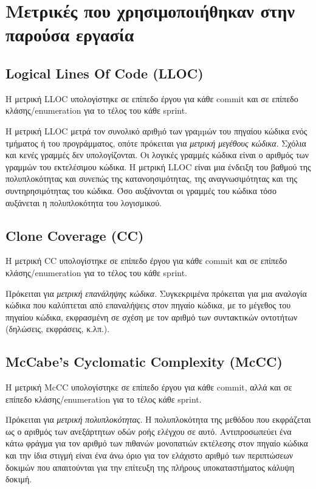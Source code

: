 \section{Μετρικές που χρησιμοποιήθηκαν στην παρούσα εργασία}

\subsection{Logical Lines Of Code (LLOC)}

Η μετρική LLOC υπολογίστηκε σε επίπεδο έργου για κάθε commit και σε
επίπεδο κλάσης/enumeration για το τέλος του κάθε sprint.

Η μετρική LLOC μετρά τον συνολικό αριθµό των γραµµών του πηγαίου κώδικα
ενός τμήματος ή του προγράμματος, οπότε πρόκειται για \emph{μετρική
μεγέθους κώδικα}. Σχόλια και κενές γραμμές δεν υπολογίζονται. Οι
λογικές γραμμές κώδικα είναι ο αριθμός των γραμμών του εκτελέσιμου
κώδικα. Η μετρική LLOC είναι μια ένδειξη του βαθμού της
πολυπλοκότητας και συνεπώς της κατανοησιμότητας, της αναγνωσιμότητας
και της συντηρησιμότητας του κώδικα. Όσο αυξάνονται οι γραμμές του
κώδικα τόσο αυξάνεται η πολυπλοκότητα του λογισμικού.


\subsection{Clone Coverage (CC)}

Η μετρική CC υπολογίστηκε σε επίπεδο έργου για κάθε commit και σε
επίπεδο κλάσης/enumeration για το τέλος του κάθε sprint.

Πρόκειται για \emph{μετρική επανάληψης κώδικα}. Συγκεκριμένα πρόκειται
για μια αναλογία κώδικα που καλύπτεται από επαναλήψεις στον πηγαίο
κώδικα, με το μέγεθος του πηγαίου κώδικα, εκφρασμένη σε σχέση με τον
αριθμό των συντακτικών οντοτήτων (δηλώσεις, εκφράσεις, κ.λπ.).

\subsection{McCabe’s Cyclomatic Complexity (McCC)}

Η μετρική McCC υπολογίστηκε σε επίπεδο έργου για κάθε commit, αλλά και
σε επίπεδο κλάσης/enumeration για το τέλος κάθε sprint. 

Πρόκειται για \emph{μετρική πολυπλοκότητας}. Η πολυπλοκότητα της μεθόδου
που εκφράζεται ως ο αριθμός των ανεξάρτητων οδών ροής ελέγχου σε αυτό.
Αντιπροσωπεύει ένα κάτω φράγμα για τον αριθμό των πιθανών μονοπατιών
εκτέλεσης στον πηγαίο κώδικα και την ίδια στιγμή είναι ένα άνω όριο για
τον ελάχιστο αριθμό των περιπτώσεων δοκιμών που απαιτούνται για την
επίτευξη της πλήρους υποκαταστήματος κάλυψη δοκιμή.

